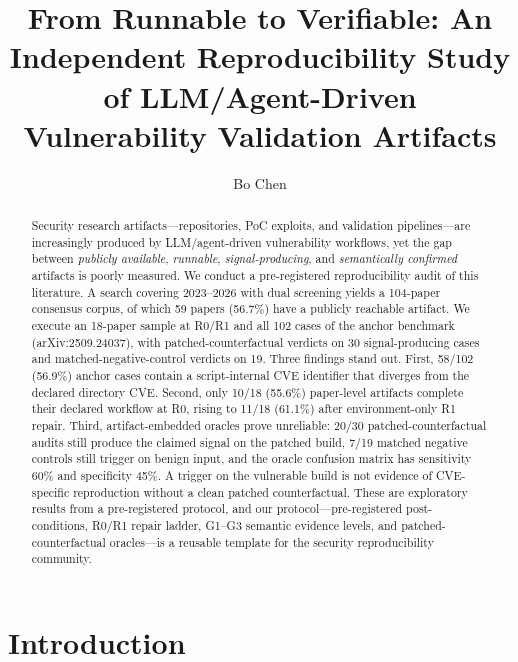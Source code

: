 \documentclass[11pt]{article}
\title{From Runnable to Verifiable: An Independent Reproducibility Study of
LLM/Agent-Driven Vulnerability Validation Artifacts}
\author[1]{Bo Chen}
\affil[1]{Institute of Computing Technology, Chinese Academy of Sciences}
\date{}
\begin{document}
\maketitle

\begin{abstract}
Security research artifacts---repositories, PoC exploits, and validation pipelines---are increasingly produced by LLM/agent-driven vulnerability workflows, yet the gap between \emph{publicly available}, \emph{runnable}, \emph{signal-producing}, and \emph{semantically confirmed} artifacts is poorly measured. We conduct a pre-registered reproducibility audit of this literature. A search covering 2023--2026 with dual screening yields a 104-paper consensus corpus, of which 59 papers (56.7\%) have a publicly reachable artifact. We execute an 18-paper sample at R0/R1 and all 102 cases of the anchor benchmark (arXiv:2509.24037), with patched-counterfactual verdicts on 30 signal-producing cases and matched-negative-control verdicts on 19. Three findings stand out. First, 58/102 (56.9\%) anchor cases contain a script-internal CVE identifier that diverges from the declared directory CVE. Second, only 10/18 (55.6\%) paper-level artifacts complete their declared workflow at R0, rising to 11/18 (61.1\%) after environment-only R1 repair. Third, artifact-embedded oracles prove unreliable: 20/30 patched-counterfactual audits still produce the claimed signal on the patched build, 7/19 matched negative controls still trigger on benign input, and the oracle confusion matrix has sensitivity 60\% and specificity 45\%. A trigger on the vulnerable build is not evidence of CVE-specific reproduction without a clean patched counterfactual. These are exploratory results from a pre-registered protocol, and our protocol---pre-registered post-conditions, R0/R1 repair ladder, G1--G3 semantic evidence levels, and patched-counterfactual oracles---is a reusable template for the security reproducibility community.
\end{abstract}

\section{Introduction}
\label{sec:intro}
\end{document}
